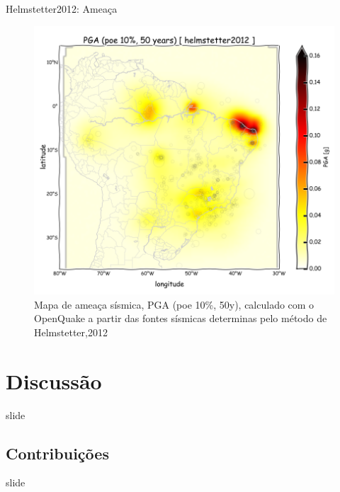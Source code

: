 \documentclass[ucs,8pt]{beamer}
\begin{document}
\begin{frame}{Helmstetter2012: Ameaça}
\begin{figure}[H]
  \centering
  \includegraphics[height=.93\textheight]{pga_helmstetter} 
  \caption{Mapa de ameaça sísmica, PGA (poe 10\%, 50y), 
  		   calculado com o OpenQuake a partir das fontes sísmicas
  		   determinas pelo método de Helmstetter,2012 }
  \label{fig:helm_h} 
\end{figure}
\end{frame}




\section{Discussão}
\begin{frame}{slide}




\end{frame}




\subsection{Contribuições}
\begin{frame}{slide}


\end{frame}
\end{document}
